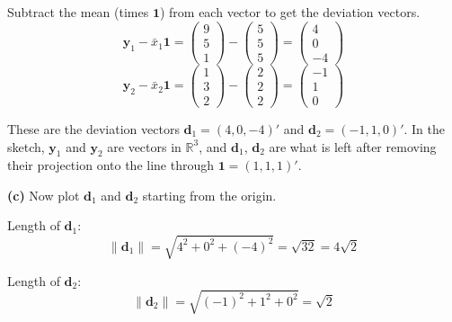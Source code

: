 \documentclass[11pt]{article}
\begin{document}
Subtract the mean (times $\mathbf 1$) from each vector to get the deviation vectors.
\[
\mathbf y_1-\bar x_1\mathbf 1=\begin{pmatrix}9\\5\\1\end{pmatrix}-\begin{pmatrix}5\\5\\5\end{pmatrix}
=\begin{pmatrix}4\\0\\-4\end{pmatrix}
\]
\[
\mathbf y_2-\bar x_2\mathbf 1=\begin{pmatrix}1\\3\\2\end{pmatrix}-\begin{pmatrix}2\\2\\2\end{pmatrix}
=\begin{pmatrix}-1\\1\\0\end{pmatrix}
\]

These are the deviation vectors $\mathbf d_1=(4,0,-4)'$ and $\mathbf d_2=(-1,1,0)'$. In the
sketch, $\mathbf y_1$ and $\mathbf y_2$ are vectors in $\mathbb R^3$, and $\mathbf d_1$,
$\mathbf d_2$ are what is left after removing their projection onto the line through
$\mathbf 1=(1,1,1)'$.

\textbf{(c)} Now plot $\mathbf d_1$ and $\mathbf d_2$ starting from the origin.

\begin{center}
\end{center}

Length of $\mathbf d_1$:
\[
\lVert \mathbf d_1\rVert=\sqrt{4^2+0^2+(-4)^2}=\sqrt{32}=\boxed{4\sqrt2}
\]

Length of $\mathbf d_2$:
\[
\lVert \mathbf d_2\rVert=\sqrt{(-1)^2+1^2+0^2}=\boxed{\sqrt2}
\]
\end{document}
